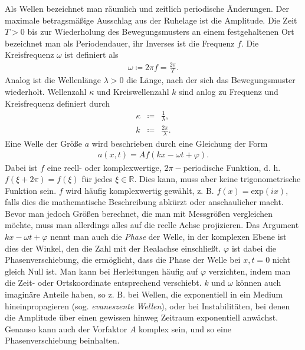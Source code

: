 \documentclass{book}
\renewcommand{\exp}{\text{exp}}
\begin{document}
Als Wellen bezeichnet man räumlich und zeitlich periodische Änderungen. Der maximale betragsmäßige Ausschlag aus der Ruhelage ist die Amplitude. Die Zeit $T > 0$ bis zur Wiederholung des Bewegungsmusters an einem festgehaltenen Ort bezeichnet man als Periodendauer, ihr Inverses ist die Frequenz $f$. Die Kreisfrequenz $\omega$ ist definiert als
%
\begin{eqnarray}
\omega \coloneqq 2\pi f = \frac{2\pi}{T}.
\end{eqnarray}
%
Analog ist die Wellenlänge $\lambda > 0$ die Länge, nach der sich das Bewegungsmuster wiederholt. Wellenzahl $\kappa$ und Kreiswellenzahl $k$ sind anlog zu Frequenz und Kreisfrequenz definiert durch
%
\begin{eqnarray}
\kappa & \coloneqq & \frac{1}{\lambda},\\
k& \coloneqq &\frac{2\pi}{\lambda}.
\end{eqnarray}
%
Eine Welle der Größe $a$ wird beschrieben durch eine Gleichung der Form
%
\begin{eqnarray}
a\left(x, t\right) = Af\left(kx - \omega t + \varphi\right).
\end{eqnarray}
%
Dabei ist $f$ eine reell- oder komplexwertige, $2\pi-$periodische Funktion, d. h. $f\left(\xi + 2\pi\right) = f\left(\xi\right)$ für jedes $\xi\in\mathbb{R}$. Dies kann, muss aber keine trigonometrische Funktion sein. $f$ wird häufig komplexwertig gewählt, z. B. $f(x) = \exp(ix)$, falls dies die mathematische Beschreibung abkürzt oder anschaulicher macht. Bevor man jedoch Größen berechnet, die man mit Messgrößen vergleichen möchte, muss man allerdings alles auf die reelle Achse projizieren. Das Argument $kx - \omega t + \varphi$ nennt man auch die \textit{Phase} der Welle, in der komplexen Ebene ist dies der Winkel, den die Zahl mit der Realachse einschließt. $\varphi$ ist dabei die Phasenverschiebung, die ermöglicht, dass die Phase der Welle bei $x, t = 0$ nicht gleich Null ist. Man kann bei Herleitungen häufig auf $\varphi$ verzichten, indem man die Zeit- oder Ortskoordinate entsprechend verschiebt. $k$ und $\omega$ können auch imaginäre Anteile haben, so z. B. bei Wellen, die exponentiell in ein Medium hineinpropagieren (sog. \textit{evaneszente Wellen}), oder bei Instabilitäten, bei denen die Amplitude über einen gewissen hinweg Zeitraum exponentiell anwächst. Genauso kann auch der Vorfaktor $A$ komplex sein, und so eine Phasenverschiebung beinhalten.
\end{document}
